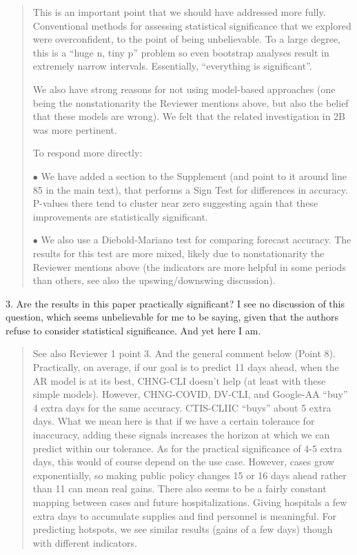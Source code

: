 \documentclass[11pt]{article}
\newenvironment{resp}{\begin{quote}\color{cobalt}}{\end{quote}}
\begin{document}
\begin{resp}
  This is an important point that we should have addressed more fully.
  Conventional methods for assessing statistical significance that we explored
  were overconfident, to the point of being unbelievable. To a large degree,
  this is a ``huge n, tiny p'' problem so even bootstrap analyses result in
  extremely narrow intervals. Essentially, ``everything is significant''.

  We also have strong reasons for not using model-based approaches (one being the
  nonstationarity the Reviewer mentions above, but also the belief that these
  models are wrong). We felt that the related investigation in 2B was more
  pertinent.

  To respond more directly:

  $\bullet$ We have added a section to the Supplement (and point
  to it around 
  line 85 in the main text), that performs a Sign Test for differences in
  accuracy. P-values there tend to cluster near zero suggesting again that these
  improvements are statistically significant.

  $\bullet$ We also use a Diebold-Mariano test
  for comparing forecast accuracy. The results for this test are more mixed,
  likely due to nonstationarity the Reviewer mentions above (the indicators are
  more helpful in some periods than others, see also the upswing/downswing
  discussion). 
\end{resp}

3. Are the results in this paper practically significant? I see no discussion of
this question, which seems unbelievable for me to be saying, given that the
authors refuse to consider statistical significance. And yet here I am.

\begin{resp}
  See also Reviewer 1 point 3. And the general comment below (Point 8).
  Practically, on average, if our goal is to predict 11 days ahead, when the AR
  model is at its best, CHNG-CLI
  doesn’t help (at least with these simple models). However, CHNG-COVID,
  DV-CLI, and Google-AA ``buy'' 4 extra days for the 
  same accuracy. CTIS-CLIIC ``buys'' about 5 extra days. What we mean here is
  that if we have a certain tolerance for inaccuracy, adding these signals increases the
  horizon at which we can predict within our tolerance. As for the
  practical significance of 4-5 extra days, this would of course depend on the use case.  However, cases grow
  exponentially, so making public policy changes 15 or 16 days ahead rather than
  11 can mean real gains. There also seems to be a fairly constant mapping
  between cases and future hospitalizations. Giving
  hospitals a few extra days to accumulate supplies and find personnel is
  meaningful. For predicting hotspots, we see similar results (gains of a few
  days) though with different indicators. 
\end{resp}
\end{document}
